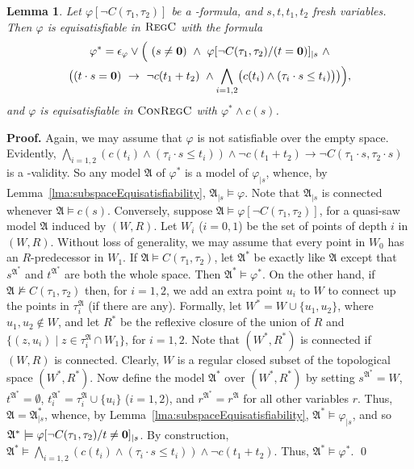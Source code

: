 \documentclass{LMCS}
\renewenvironment{proof}{\par\noindent\textbf{Proof.}}{\mbox{}\qed\par\medskip}
\theoremstyle{plain}
\newtheorem{lemma}[thm]{Lemma}
\newcommand{\fA}{\mathfrak{A}}\newcommand{\fB}{\mathfrak{B}}\newcommand{\fM}{\mathfrak{M}}\newcommand{\cK}{\mathcal{K}}\newcommand{\R}{\mathbb{R}}\newcommand{\cR}{\mathcal{R}}\newcommand{\cL}{\mathcal{L}}\newcommand{\cLc}{\mathcal{L}c}\newcommand{\cLcc}{\mathcal{L}cc}
\newcommand{\Regc}{\textsc{RegC}}
\newcommand{\ConR}{\textsc{ConRegC}}
\begin{document}
\begin{lemma}\label{lma:poss3}
Let $\varphi[\neg C(\tau_1,\tau_2)]$ be a \cBCcc-formula, and $s, t, t_1,
t_2$ fresh variables. Then $\varphi$ is
equisatisfiable
in $\Regc$ with the formula
\begin{multline*}
\varphi^*  = \epsilon_\varphi \vee
\Bigl(\ (s \ne \mathbf{0}) \ \land \ \varphi[\neg C(\tau_1,\tau_2)/(t = \mathbf{0})]_{\mid s} \
\land\\
   \bigl((t\cdot s = \mathbf{0})  \ \rightarrow  \
\neg c(t_1 + t_2) \ \land \bigwedge_{i = 1,2}
         \bigl(c(t_i) \land (\tau_i \cdot s \leq t_i)\bigr)\bigr)\Bigr),
\end{multline*}
and $\varphi$ is equisatisfiable in $\ConR$ with $\varphi^* \land c(s)$.
\end{lemma}
\begin{proof}
Again, we may assume that $\varphi$ is not satisfiable over the empty space.
Evidently, $\bigwedge_{i = 1,2} \left(c(t_i) \land (\tau_i \cdot s
\leq t_i) \right) \wedge \neg c(t_1 + t_2) \rightarrow \neg C(\tau_1
\cdot s, \tau_2 \cdot s)$ is a \cBCcc-validity. So any model $\fA$ of
$\varphi^*$ is a model of $\varphi_{\mid s}$,
whence, by Lemma~\ref{lma:subspaceEquisatisfiability}, $\fA_{\mid s}
\models \varphi$. Note that $\mathfrak{A}_{\mid s}$ is connected whenever $\mathfrak{A}\models c(s)$.
Conversely, suppose $\fA
\models \varphi[\neg C(\tau_1,\tau_2)]$, for a quasi-saw model $\fA$
induced by $(W,R)$. Let $W_i$ ($i = 0,1$) be the set of points of
depth $i$ in $(W,R)$. Without loss of generality, we may assume that
every point in $W_0$ has an $R$-predecessor in $W_1$.  If $\fA \models
C(\tau_1, \tau_2)$, let $\fA^*$ be exactly like $\fA$ except that
$s^{\fA^*}$ and $t^{\fA^*}$ are both the whole space. Then $\fA^*
\models \varphi^*$. On the other hand, if $\fA \not \models
C(\tau_1, \tau_2)$
then, for $i = 1,2$,
we add an extra point $u_i$ to $W$ to connect up
the points in $\tau_i^\fA$ (if there are any). Formally, let $W^* = W \cup \{u_1, u_2\}$,
where $u_1, u_2 \not \in W$, and let $R^*$ be the reflexive closure of
the union of $R$ and $\{(z,u_i) \mid z \in \tau_i^\fA \cap W_1 \}$,
for $i = 1,2$.  Note that
$(W^*, R^*)$ is connected if $(W, R)$ is connected.
Clearly, $W$ is a regular closed subset of the
topological space $(W^*, R^*)$.  Now define the model $\fA^*$ over
$(W^*, R^*)$ by setting $s^{\fA^*} = W$, $t^{\fA^*} = \emptyset$, $t_i
^{\fA^*} = \tau_i^\fA \cup \{u_i \}$ ($i = 1,2$), and $r^{\fA^*} =
r^\fA$ for all other variables $r$. Thus, $\fA = \fA^*_{\mid s}$,
whence, by Lemma~\ref{lma:subspaceEquisatisfiability}, $\fA^* \models
\varphi_{\mid s}$, and so $\fA^*
\models \varphi[\neg C(\tau_1,\tau_2)/t \neq \zero]_{\mid s}$. By
construction, $\fA^* \models \bigwedge_{i = 1,2} \left(c(t_i) \land
(\tau_i \cdot s \leq t_i)\right) \wedge \neg c(t_1 + t_2)$. Thus,
$\fA^*\models\varphi^*$.
\end{proof}
\end{document}
